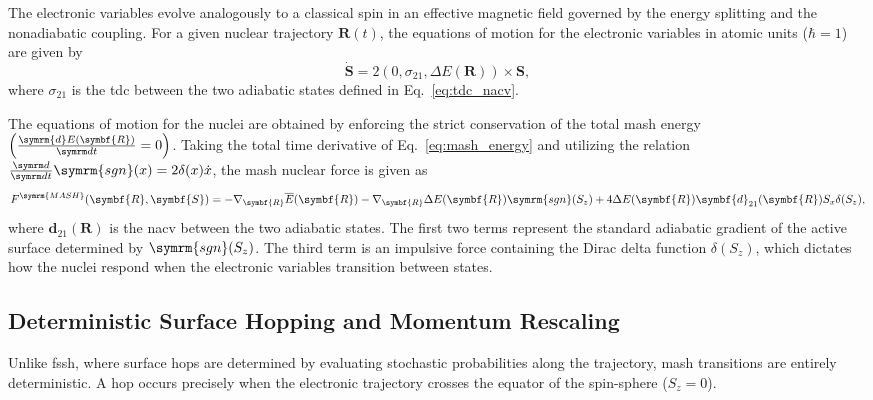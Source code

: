The electronic variables evolve analogously to a classical spin in an effective magnetic field governed by the energy splitting and the nonadiabatic coupling. For a given nuclear trajectory $\symbf{R}(t)$, the equations of motion for the electronic variables in atomic units ($\hbar=1$) are given by
\begin{equation}
\dot{\symbf{S}}=2\left(0,\sigma_{21},\Delta E(\symbf{R})\right)\times\symbf{S},
\end{equation}
where $\sigma_{21}$ is the \gls{tdc} between the two adiabatic states defined in Eq.~\eqref{eq:tdc_nacv}.

The equations of motion for the nuclei are obtained by enforcing the strict conservation of the total \gls{mash} energy $\left(\frac{\symrm{d}E(\symbf{R})}{\dt}=0\right)$. Taking the total time derivative of Eq.~\eqref{eq:mash_energy} and utilizing the relation $\ddt\symrm{sgn}(x) = 2\delta(x)\dot{x}$, the \gls{mash} nuclear force is given as
\begin{equation}\label{eq:mash_force}
F^{\symrm{MASH}}(\symbf{R},\symbf{S})=-\nabla_{\symbf{R}}\overline{E}(\symbf{R})-\nabla_{\symbf{R}}\Delta E(\symbf{R})\symrm{sgn}(S_z)+4\Delta E(\symbf{R})\symbf{d}_{21}(\symbf{R})S_x\delta(S_z),
\end{equation}
where $\symbf{d}_{21}(\symbf{R})$ is the \gls{nacv} between the two adiabatic states. The first two terms represent the standard adiabatic gradient of the active surface determined by $\symrm{sgn}(S_z)$. The third term is an impulsive force containing the Dirac delta function $\delta(S_z)$, which dictates how the nuclei respond when the electronic variables transition between states.
\subsection{Deterministic Surface Hopping and Momentum Rescaling}\label{sec:mash_hopping}
Unlike \gls{fssh}, where surface hops are determined by evaluating stochastic probabilities along the trajectory, \gls{mash} transitions are entirely deterministic. A hop occurs precisely when the electronic trajectory crosses the equator of the spin-sphere ($S_z=0$). 

